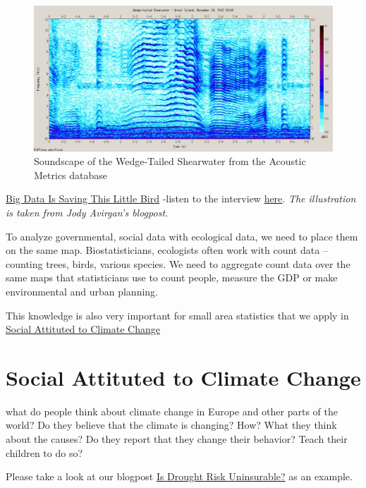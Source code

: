 \documentclass[
  a4paper,
  openany, a4paper, oneside]{book}
\begin{document}
\begin{figure}

{\centering \includegraphics[width=0.8\linewidth]{plots/greendeal/wedgetailedshearwater} 

}

\caption{Soundscape of the Wedge-Tailed Shearwater from the Acoustic Metrics database}\label{fig:wedgetailedshearwater}
\end{figure}

\href{https://fivethirtyeight.com/features/big-data-is-saving-this-little-bird/}{Big Data Is Saving This Little Bird} -listen to the interview \href{https://podcasts.apple.com/us/podcast/17-little-bird-big-data/id1011406983?i=1000391467965}{here}. \emph{The illustration is taken from Jody Avirgan's blogpost.}

To analyze governmental, social data with ecological data, we need to place them on the same map. Biostatisticians, ecologists often work with count data -- counting trees, birds, various species. We need to aggregate count data over the same maps that statisticians use to count people, measure the GDP or make environmental and urban planning.

This knowledge is also very important for small area statistics that we apply in \protect\hyperlink{social-attitude-climate-change}{Social Attituted to Climate Change}

\hypertarget{social-attitude-climate-change}{%
\section{Social Attituted to Climate Change}\label{social-attitude-climate-change}}

what do people think about climate change in Europe and other parts of the world? Do they believe that the climate is changing? How? What they think about the causes? Do they report that they change their behavior? Teach their children to do so?

Please take a look at our blogpost \href{http://greendeal.dataobservatory.eu/post/2021-04-23-belgium-flood-insurance/}{Is Drought Risk Uninsurable?} as an example.
\end{document}
